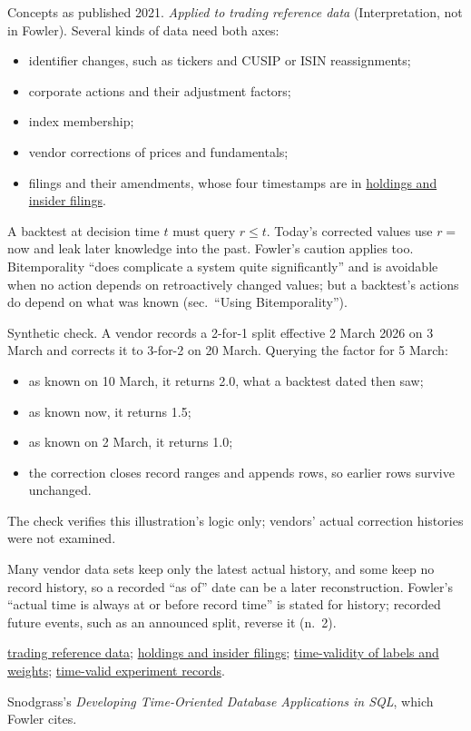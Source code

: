 \begin{qfmethod}
 Concepts as published 2021. \emph{Applied to trading reference data} (Interpretation, not in Fowler). Several kinds of data need both axes:
\begin{itemize}
\item identifier changes, such as tickers and CUSIP or ISIN reassignments;
\item corporate actions and their adjustment factors;
\item index membership;
\item vendor corrections of prices and fundamentals;
\item filings and their amendments, whose four timestamps are in \hyperref[data:holdings-insider-filing-lags]{holdings and insider filings}.
\end{itemize}
A backtest at decision time $t$ must query $r\le t$. Today's corrected values use $r=$ now and leak later knowledge into the past. Fowler's caution applies too. Bitemporality ``does complicate a system quite significantly'' and is avoidable when no action depends on retroactively changed values; but a backtest's actions do depend on what was known (sec.~``Using Bitemporality'').

 Synthetic check. A vendor records a 2-for-1 split effective 2 March 2026 on 3 March and corrects it to 3-for-2 on 20 March. Querying the factor for 5 March:
\begin{itemize}
\item as known on 10 March, it returns 2.0, what a backtest dated then saw;
\item as known now, it returns 1.5;
\item as known on 2 March, it returns 1.0;
\item the correction closes record ranges and appends rows, so earlier rows survive unchanged.
\end{itemize}
The check verifies this illustration's logic only; vendors' actual correction histories were not examined.

 Many vendor data sets keep only the latest actual history, and some keep no record history, so a recorded ``as of'' date can be a later reconstruction. Fowler's ``actual time is always at or before record time'' is stated for history; recorded future events, such as an announced split, reverse it (n.~2).

 \hyperref[data:trading-reference-data]{trading reference data}; \hyperref[data:holdings-insider-filing-lags]{holdings and insider filings}; \hyperref[pit:label-weight-leakage]{time-validity of labels and weights}; \hyperref[meth:time-valid-ml-experiment-record]{time-valid experiment records}.

 Snodgrass's \emph{Developing Time-Oriented Database Applications in SQL}, which Fowler cites.

\end{qfmethod}
